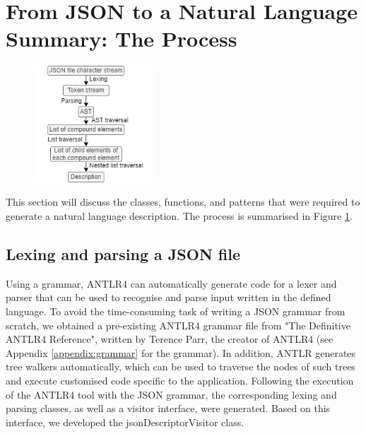 \documentclass{l4proj}
\begin{document}
\section{From JSON to a Natural Language Summary: The Process} 

\begin{figure}
    \centering
    \includegraphics[width=0.4\textwidth]{dissertation/images/jsontodesc.png}    
    \caption{}
    \label{fig:jsontodesc}
\end{figure}

This section will discuss the classes, functions, and patterns that were required to generate a natural language description. The process is summarised in Figure \ref{fig:jsontodesc}.








\subsection{Lexing and parsing a JSON file} 

Using a grammar, ANTLR4 can automatically generate code for a lexer and parser that can be used to recognise and parse input written in the defined language. To avoid the time-consuming task of writing a JSON grammar from scratch, we obtained a pre-existing ANTLR4 grammar file from "The Definitive ANTLR4 Reference", written by Terence Parr, the creator of ANTLR4\cite{parr2013definitive} (see Appendix \ref{appendix:grammar} for the grammar). In addition, ANTLR generates tree walkers automatically, which can be used to traverse the nodes of such trees and execute customised code specific to the application. Following the execution of the ANTLR4 tool with the JSON grammar, the corresponding lexing and parsing classes, as well as a visitor interface, were generated. Based on this interface, we developed the jsonDescriptorVisitor class.
\end{document}
